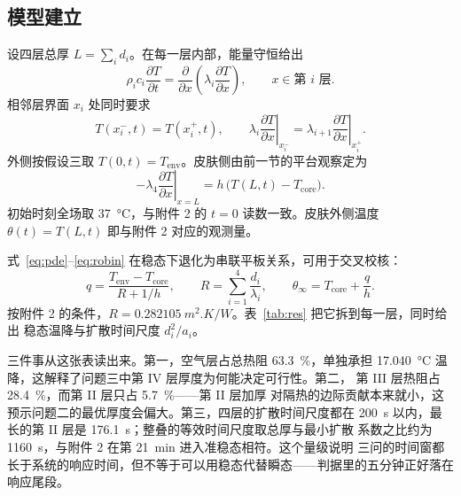 \documentclass[withoutpreface,bwprint]{cumcmthesis}
\begin{document}
\subsection{模型建立}

设四层总厚 $L=\sum_i d_i$。在每一层内部，能量守恒给出
\begin{equation}
  \rho_i c_i \frac{\partial T}{\partial t}
  = \frac{\partial}{\partial x}\!\left(\lambda_i \frac{\partial T}{\partial x}\right),
  \qquad x \in \text{第 } i \text{ 层}.
  \label{eq:pde}
\end{equation}
相邻层界面 $x_{i}$ 处同时要求
\begin{equation}
  T(x_i^-,t)=T(x_i^+,t), \qquad
  \lambda_i \left.\frac{\partial T}{\partial x}\right|_{x_i^-}
  = \lambda_{i+1} \left.\frac{\partial T}{\partial x}\right|_{x_i^+}.
  \label{eq:interface}
\end{equation}
外侧按假设三取 $T(0,t)=T_{\mathrm{env}}$。皮肤侧由前一节的平台观察定为
\begin{equation}
  -\lambda_4 \left.\frac{\partial T}{\partial x}\right|_{x=L}
  = h\,\bigl(T(L,t)-T_{\mathrm{core}}\bigr).
  \label{eq:robin}
\end{equation}
初始时刻全场取 \SI{37}{\celsius}，与附件 2 的 $t=0$ 读数一致。皮肤外侧温度
$\theta(t)=T(L,t)$ 即与附件 2 对应的观测量。

式~\eqref{eq:pde}--\eqref{eq:robin} 在稳态下退化为串联平板关系，可用于交叉校核：
\begin{equation}
  q=\frac{T_{\mathrm{env}}-T_{\mathrm{core}}}{R+1/h},
  \qquad R=\sum_{i=1}^{4}\frac{d_i}{\lambda_i},
  \qquad \theta_{\infty}=T_{\mathrm{core}}+\frac{q}{h}.
  \label{eq:steady}
\end{equation}
按附件 2 的条件，$R=\SI{0.282105}{m^2.K/W}$。表~\ref{tab:res} 把它拆到每一层，同时给出
稳态温降与扩散时间尺度 $d_i^2/a_i$。

\begin{table}[htbp]
  \centering
  \caption{附件 2 条件下的逐层热阻、稳态温降与扩散时间尺度}
  \label{tab:res}
  
\end{table}

三件事从这张表读出来。第一，空气层占总热阻 \SI{63.3}{\percent}，单独承担
\SI{17.040}{\celsius} 温降，这解释了问题三中第 IV 层厚度为何能决定可行性。第二，
第 III 层热阻占 \SI{28.4}{\percent}，而第 II 层只占 \SI{5.7}{\percent}——第 II 层加厚
对隔热的边际贡献本来就小，这预示问题二的最优厚度会偏大。第三，四层的扩散时间尺度都在
\SI{200}{s} 以内，最长的第 II 层是 \SI{176.1}{s}；整叠的等效时间尺度取总厚与最小扩散
系数之比约为 \SI{1160}{s}，与附件 2 在第 \SI{21}{min} 进入准稳态相符。这个量级说明
三问的时间窗都长于系统的响应时间，但不等于可以用稳态代替瞬态——判据里的五分钟正好落在
响应尾段。
\end{document}
